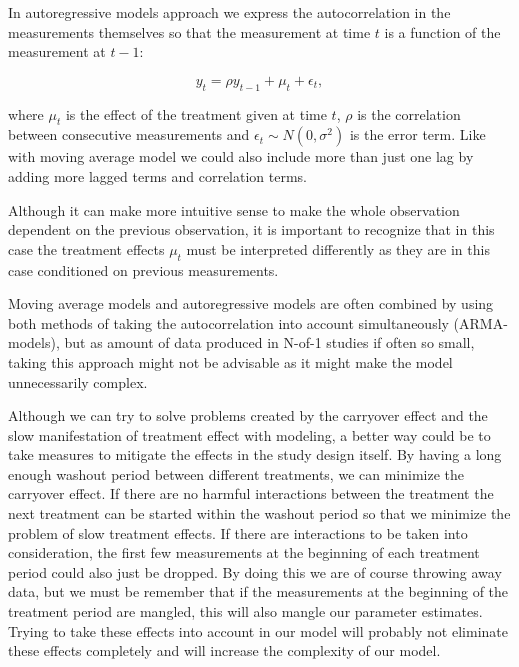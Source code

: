 \documentclass[12pt,a4paper,leqno]{report}
\theoremstyle{plain}
\theoremstyle{definition}
\theoremstyle{remark}
\begin{document}
In autoregressive models approach we express the autocorrelation in the
measurements themselves so that the measurement at time \(t\) is a function of
the measurement at \(t-1\):

\begin{def}\label{}
    \begin{equation}\label{}
        y_t = \rho y_{t-1} + \mu_t + \epsilon_t,
    \end{equation}
\end{def}where \(\mu_t\) is the effect of the treatment given at time \(t\),
\(\rho \) is the correlation between consecutive measurements and \(\epsilon_t
\sim N(0,\sigma^2)\) is the error term. Like with moving average model we could
also include more than just one lag by adding more lagged terms and correlation
terms.

Although it can make more intuitive sense to make the whole observation
dependent on the previous observation, it is important to recognize that in this
case the treatment effects \(\mu_t\) must be interpreted differently as they are
in this case conditioned on previous measurements.

Moving average models and autoregressive models are often combined by using both
methods of taking the autocorrelation into account simultaneously (ARMA-models), but as
amount of data produced in N-of-1 studies if often so small, taking this approach might not be advisable as it might make the model unnecessarily
complex.

Although we can try to solve problems created by the carryover effect and the slow
manifestation of treatment effect with modeling, a better way could be to take
measures to mitigate the effects in the study design itself. By having a long
enough washout period between different treatments, we can minimize the
carryover effect. If there are no harmful interactions between the treatment the
next treatment can be started within the washout period so that we minimize the
problem of slow treatment effects. If there are interactions to be taken into
consideration, the first few measurements at the beginning of each treatment
period could also just be dropped. By doing this we are of course throwing away
data, but we must be remember that if the measurements at the beginning of the
treatment period are mangled, this will also mangle our parameter estimates.
Trying to take these effects into account in our model will probably not
eliminate these effects completely and will increase the complexity of our
model.
\end{document}
